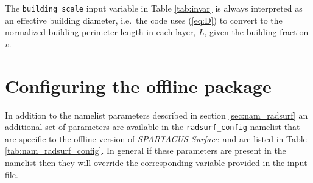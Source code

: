 \documentclass[a4,oneside]{article}
\def\codesize{\small}
\def\spsurf{\emph{SPARTACUS-Surface}}
\def\code#1{{\codesize\texttt{#1}}}
\begin{document}
The \code{building\_scale} input variable in Table \ref{tab:invar} is
always interpreted as an effective building diameter, i.e.\ the code
uses (\ref{eq:D}) to convert to the normalized building perimeter
length in each layer, $L$, given the building fraction $v$.

\section{Configuring the offline package}
\label{sec:nam_radsurf_config}
In addition to the namelist parameters described in section
\ref{sec:nam_radsurf} an additional set of parameters are available in
the \code{radsurf\_config} namelist that are specific to the offline
version of \spsurf\ and are listed in Table
\ref{tab:nam_radsurf_config}. In general if these parameters are
present in the namelist then they will override the corresponding
variable provided in the input file.
\end{document}
